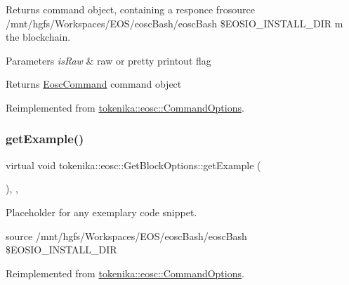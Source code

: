 Returns command object, containing a responce frosource /mnt/hgfs/\+Workspaces/\+E\+O\+S/eosc\+Bash/eosc\+Bash \$\+E\+O\+S\+I\+O\+\_\+\+I\+N\+S\+T\+A\+L\+L\+\_\+\+D\+IR m the blockchain. 


\begin{DoxyParams}{Parameters}
{\em is\+Raw} & raw or pretty printout flag \\
\hline
\end{DoxyParams}
\begin{DoxyReturn}{Returns}
\hyperlink{classtokenika_1_1eosc_1_1_eosc_command}{Eosc\+Command} command object 
\end{DoxyReturn}


Reimplemented from \hyperlink{classtokenika_1_1eosc_1_1_command_options_a787f15164e2055394d9d948c07bf201c}{tokenika\+::eosc\+::\+Command\+Options}.

\mbox{\label{classtokenika_1_1eosc_1_1_get_block_options_ace1d886b5fb260150df8d291339fbd03}} 
\subsubsection{\texorpdfstring{get\+Example()}{getExample()}}
{\footnotesize\ttfamily virtual void tokenika\+::eosc\+::\+Get\+Block\+Options\+::get\+Example (\begin{DoxyParamCaption}{ }\end{DoxyParamCaption})\hspace{0.3cm}{\ttfamily [inline]}, {\ttfamily [protected]}, {\ttfamily [virtual]}}



Placeholder for any exemplary code snippet. 

source /mnt/hgfs/\+Workspaces/\+E\+O\+S/eosc\+Bash/eosc\+Bash \$\+E\+O\+S\+I\+O\+\_\+\+I\+N\+S\+T\+A\+L\+L\+\_\+\+D\+IR 

Reimplemented from \hyperlink{classtokenika_1_1eosc_1_1_command_options_ab1fe134b6c2230257a5c07b021812986}{tokenika\+::eosc\+::\+Command\+Options}.

\mbox{\label{classtokenika_1_1eosc_1_1_get_block_options_a8d45be43c2a93468910db4533db832cc}} 
